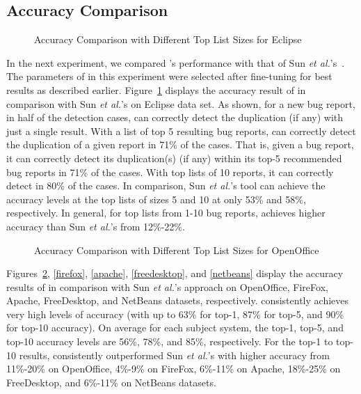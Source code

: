 \subsection{Accuracy Comparison}

\begin{figure}[t]
\centerline{\epsfxsize=3.3in }
\caption{Accuracy Comparison with Different Top List Sizes for Eclipse}
\label{eclipse}
\end{figure}

In the next experiment, we compared {\model}'s performance with that
of Sun {\em et al.}'s~\cite{davidlo10}. The parameters of {\model} in
this experiment were selected after fine-tuning for best results as
described earlier. Figure~\ref{eclipse} displays the accuracy result
of {\model} in comparison with Sun {\em et al.}'s on Eclipse data
set. As shown, for a new bug report, in half of the detection cases,
{\model} can correctly detect the duplication (if any) with just a
single result. With a list of top 5 resulting bug reports, {\model}
can correctly detect the duplication of a given report in 71\% of the
cases. That is, given a bug report, it can correctly detect its
duplication(s) (if any) within its top-5 recommended bug reports in
71\% of the cases. With top lists of 10 reports, it can correctly
detect in 80\% of the cases. In comparison, Sun {\em et al.}'s tool
can achieve the accuracy levels at the top lists of sizes 5 and 10 at
only 53\% and 58\%, respectively. In general, for top lists from 1-10
bug reports, {\model} achieves higher accuracy than Sun {\em et al.}'s
from 12\%-22\%.

\begin{figure}[t]
\centerline{\epsfxsize=3.3in }
\caption{Accuracy Comparison with Different Top List Sizes for OpenOffice}
\label{openoffice}
\end{figure}

Figures~\ref{openoffice}, \ref{firefox}, \ref{apache},
\ref{freedesktop}, and \ref{netbeans} display the accuracy results of
{\model} in comparison with Sun {\em et al.}'s approach on OpenOffice,
FireFox, Apache, FreeDesktop, and NetBeans datasets,
respectively. {\model} consistently achieves very high levels of
accuracy (with up to 63\% for top-1, 87\% for top-5, and 90\% for
top-10 accuracy). On average for each subject system, the top-1,
top-5, and top-10 accuracy levels are 56\%, 78\%, and 85\%,
respectively. For the top-1 to top-10 results, {\model} consistently
outperformed Sun {\em et al.}'s with higher accuracy from 11\%-20\% on
OpenOffice, 4\%-9\% on FireFox, 6\%-11\% on Apache, 18\%-25\% on
FreeDesktop, and 6\%-11\% on NetBeans datasets.


